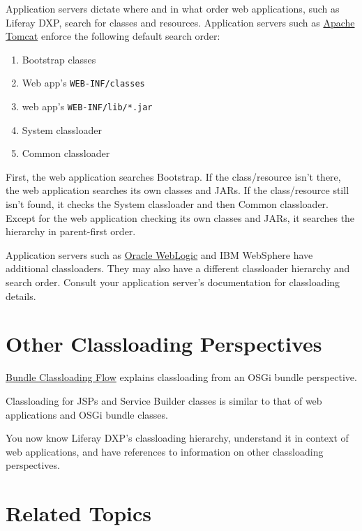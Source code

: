 Application servers dictate where and in what order web applications,
such as Liferay DXP, search for classes and resources. Application
servers such as
\href{https://tomcat.apache.org/tomcat-9.0-doc/class-loader-howto.html}{Apache
Tomcat} enforce the following default search order:

\begin{enumerate}
\def\labelenumi{\arabic{enumi}.}
\tightlist
\item
  Bootstrap classes
\item
  Web app's \texttt{WEB-INF/classes}
\item
  web app's \texttt{WEB-INF/lib/*.jar}
\item
  System classloader
\item
  Common classloader
\end{enumerate}

First, the web application searches Bootstrap. If the class/resource
isn't there, the web application searches its own classes and JARs. If
the class/resource still isn't found, it checks the System classloader
and then Common classloader. Except for the web application checking its
own classes and JARs, it searches the hierarchy in parent-first order.

Application servers such as
\href{https://docs.oracle.com/cd/E19501-01/819-3659/beadf/index.html}{Oracle
WebLogic} and IBM WebSphere have additional classloaders. They may also
have a different classloader hierarchy and search order. Consult your
application server's documentation for classloading details.

\section{Other Classloading
Perspectives}\label{other-classloading-perspectives}

\href{/docs/7-2/customization/-/knowledge_base/c/bundle-classloading-flow}{Bundle
Classloading Flow} explains classloading from an OSGi bundle
perspective.

Classloading for JSPs and Service Builder classes is similar to that of
web applications and OSGi bundle classes.

You now know Liferay DXP's classloading hierarchy, understand it in
context of web applications, and have references to information on other
classloading perspectives.

\section{Related Topics}\label{related-topics-8}

